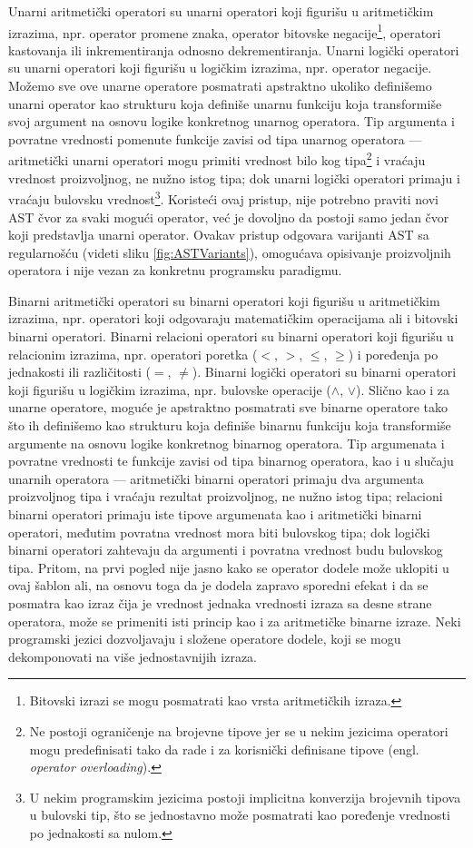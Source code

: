 Unarni aritmetički operatori su unarni operatori koji figurišu u aritmetičkim izrazima, npr. operator promene znaka, operator bitovske negacije\footnote{Bitovski izrazi se mogu posmatrati kao vrsta aritmetičkih izraza.}, operatori kastovanja ili inkrementiranja odnosno dekrementiranja. Unarni logički operatori su unarni operatori koji figurišu u logičkim izrazima, npr. operator negacije. Možemo sve ove unarne operatore posmatrati apstraktno ukoliko definišemo unarni operator kao strukturu koja definiše unarnu funkciju koja transformiše svoj argument na osnovu logike konkretnog unarnog operatora. Tip argumenta i povratne vrednosti pomenute funkcije zavisi od tipa unarnog operatora --- aritmetički unarni operatori mogu primiti vrednost bilo kog tipa\footnote{Ne postoji ograničenje na brojevne tipove jer se u nekim jezicima operatori mogu predefinisati tako da rade i za korisnički definisane tipove (engl. \emph{operator overloading}).} i vraćaju vrednost proizvoljnog, ne nužno istog tipa; dok unarni logički operatori primaju i vraćaju bulovsku vrednost\footnote{U nekim programskim jezicima postoji implicitna konverzija brojevnih tipova u bulovski tip, što se jednostavno može posmatrati kao poređenje vrednosti po jednakosti sa nulom.}. Koristeći ovaj pristup, nije potrebno praviti novi AST čvor za svaki mogući operator, već je dovoljno da postoji samo jedan čvor koji predstavlja unarni operator. Ovakav pristup odgovara varijanti AST sa regularnošću (videti sliku \ref{fig:ASTVariants}), omogućava opisivanje proizvoljnih operatora i nije vezan za konkretnu programsku paradigmu.

Binarni aritmetički operatori su binarni operatori koji figurišu u aritmetičkim izrazima, npr. operatori koji odgovaraju matematičkim operacijama ali i bitovski binarni operatori. Binarni relacioni operatori su binarni operatori koji figurišu u relacionim izrazima, npr. operatori poretka ($<$, $>$, $\leq$, $\geq$) i poređenja po jednakosti ili različitosti ($=$, $\neq$). Binarni logički operatori su binarni operatori koji figurišu u logičkim izrazima, npr. bulovske operacije ($\wedge$, $\vee$). Slično kao i za unarne operatore, moguće je apstraktno posmatrati sve binarne operatore tako što ih definišemo kao strukturu koja definiše binarnu funkciju koja transformiše argumente na osnovu logike konkretnog binarnog operatora. Tip argumenata i povratne vrednosti te funkcije zavisi od tipa binarnog operatora, kao i u slučaju unarnih operatora --- aritmetički binarni operatori primaju dva argumenta proizvoljnog tipa i vraćaju rezultat proizvoljnog, ne nužno istog tipa; relacioni binarni operatori primaju iste tipove argumenata kao i aritmetički binarni operatori, međutim povratna vrednost mora biti bulovskog tipa; dok logički binarni operatori zahtevaju da argumenti i povratna vrednost budu bulovskog tipa. Pritom, na prvi pogled nije jasno kako se operator dodele može uklopiti u ovaj šablon ali, na osnovu toga da je dodela zapravo sporedni efekat i da se posmatra kao izraz čija je vrednost jednaka vrednosti izraza sa desne strane operatora, može se primeniti isti princip kao i za aritmetičke binarne izraze. Neki programski jezici dozvoljavaju i složene operatore dodele, koji se mogu dekomponovati na više jednostavnijih izraza.

